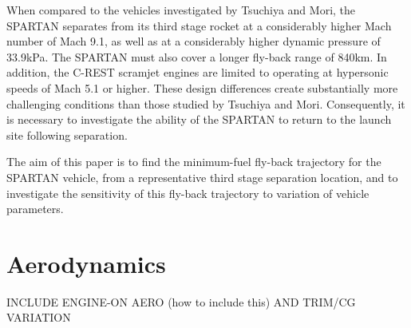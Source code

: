 \documentclass[journal]{new-aiaa} %
\begin{document}
When compared to the vehicles investigated by Tsuchiya and Mori\cite{Tsuchiya2005}, the SPARTAN separates from its third stage rocket at a considerably higher Mach number of Mach 9.1, as well as at a considerably higher dynamic pressure of 33.9kPa. The SPARTAN must also cover a longer fly-back range of 840km. In addition, the C-REST scramjet engines are limited to operating at hypersonic speeds of Mach 5.1 or higher. These design differences create substantially more challenging conditions than those studied by Tsuchiya and Mori. Consequently, it is necessary to investigate the ability of the SPARTAN to return to the launch site following separation. 

The aim of this paper is to find the minimum-fuel fly-back trajectory for the SPARTAN vehicle, from a representative third stage separation location, and to investigate the sensitivity of this fly-back trajectory to variation of vehicle parameters. 











\section{Aerodynamics}\label{sec:aero}
INCLUDE ENGINE-ON AERO (how to include this)
AND TRIM/CG VARIATION
\end{document}
